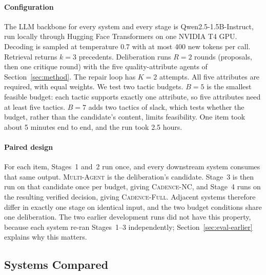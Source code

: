 \documentclass[preprint,12pt,authoryear]{elsarticle}
\newcommand{\sysMA}{\textsc{Multi-Agent}}
\newcommand{\sysNC}{\textsc{Cadence-NC}}
\newcommand{\sysFull}{\textsc{Cadence-Full}}
\renewcommand{\_}{\textunderscore\allowbreak{}}
\begin{document}
\paragraph{Configuration} The LLM backbone for every system and every stage is Qwen2.5-1.5B-Instruct, run locally through Hugging Face Transformers on one NVIDIA T4 GPU. Decoding is sampled at temperature 0.7 with at most 400 new tokens per call. Retrieval returns $k=3$ precedents. Deliberation runs $R=2$ rounds (proposals, then one critique round) with the five quality-attribute agents of Section~\ref{sec:method}. The repair loop has $K=2$ attempts. All five attributes are required, with equal weights. We test two tactic budgets. $B=5$ is the smallest feasible budget: each tactic supports exactly one attribute, so five attributes need at least five tactics. $B=7$ adds two tactics of slack, which tests whether the budget, rather than the candidate's content, limits feasibility. One item took about 5 minutes end to end, and the run took 2.5 hours.

\paragraph{Paired design} For each item, Stages~1 and~2 run once, and every downstream system consumes that same output. \sysMA{} is the deliberation's candidate. Stage~3 is then run on that candidate once per budget, giving \sysNC{}, and Stage~4 runs on the resulting verified decision, giving \sysFull{}. Adjacent systems therefore differ in exactly one stage on identical input, and the two budget conditions share one deliberation. The two earlier development runs did not have this property, because each system re-ran Stages~1--3 independently; Section~\ref{sec:eval-earlier} explains why this matters.

\subsection{Systems Compared}
\end{document}
